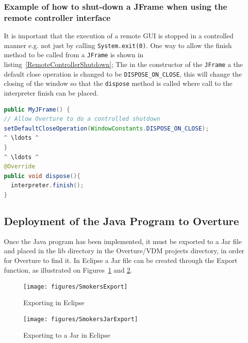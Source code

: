 \documentclass{overturerepchap}
\begin{document}
\subsubsection{Example of how to shut-down a JFrame when using the remote controller interface}
It is important that the execution of a remote GUI is stopped in a controlled manner e.g. not just by calling \texttt{System.exit(0)}. One way to allow the finish method to be called from a \texttt{JFrame} is shown in listing~\ref{RemoteControllerShutdown}; The in the constructor of the \texttt{JFrame} a the default close operation is changed to be \texttt{DISPOSE\_ON\_CLOSE}, this will change the closing of the window so that the \texttt{dispose} method is called where call to the interpreter finish can be placed.

\begin{lstlisting}[language=Java,label=RemoteControllerShutdown,caption=Java implementation of a \texttt{finish} method for a \texttt{JFrame}., captionpos=b]
public MyJFrame() {
// Allow Overture to do a controlled shutdown
setDefaultCloseOperation(WindowConstants.DISPOSE_ON_CLOSE);
^ \ldots ^
}
^ \ldots ^
@Override
public void dispose(){
  interpreter.finish();
}
\end{lstlisting}

\subsection{Deployment of the Java Program to Overture}
Once the Java program has been implemented, it must be exported to a Jar file and placed in the lib directory in the Overture/VDM projects directory, in order for Overture to find it.
In Eclipse a Jar file can be created through the Export function, as illustrated on Figures~\ref{fig:gui:EclipseExport} and \ref{fig:gui:JarExport}.

\begin{figure}[h]
\begin{center}
  \texttt{[image: figures/SmokersExport]}
  \caption[labelInTOC]{Exporting in Eclipse}
  \label{fig:gui:EclipseExport}
\end{center}
\end{figure}

\begin{figure}[h]
\begin{center}
  \texttt{[image: figures/SmokersJarExport]}
  \caption[labelInTOC]{Exporting to a Jar in Eclipse}
  \label{fig:gui:JarExport}
\end{center}
\end{figure}
\end{document}
